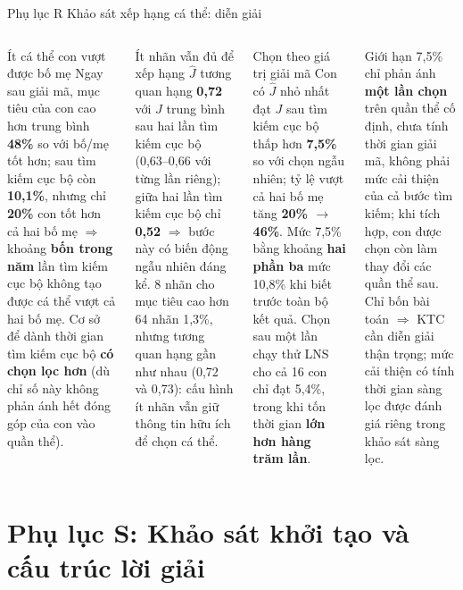 \documentclass[aspectratio=169,10pt,t,xcolor={table}]{beamer}
\newcommand{\Jhat}{\widehat{J}}
\newcommand{\apptitle}[2]{Phụ lục #1 \textperiodcentered{} #2}
\begin{document}
\begin{frame}{\apptitle{R}{Khảo sát xếp hạng cá thể: diễn giải}}
\begin{columns}[T,onlytextwidth]
\begin{block}{Ít cá thể con vượt được bố mẹ}
\scriptsize Ngay sau giải mã, mục tiêu của con cao hơn trung bình \textbf{48\%} so với bố/mẹ tốt hơn; sau tìm kiếm cục bộ còn \textbf{10,1\%}, nhưng chỉ \textbf{20\%} con tốt hơn cả hai bố mẹ $\Rightarrow$ khoảng \textbf{bốn trong năm} lần tìm kiếm cục bộ không tạo được cá thể vượt cả hai bố mẹ. Cơ sở để dành thời gian tìm kiếm cục bộ \textbf{có chọn lọc hơn} (dù chỉ số này không phản ánh hết đóng góp của con vào quần thể).
\end{block}
\begin{block}{Ít nhãn vẫn đủ để xếp hạng}
\scriptsize $\Jhat$ tương quan hạng \textbf{0,72} với $J$ trung bình sau hai lần tìm kiếm cục bộ (0,63--0,66 với từng lần riêng); giữa hai lần tìm kiếm cục bộ chỉ \textbf{0,52} $\Rightarrow$ bước này có biến động ngẫu nhiên đáng kể. 8 nhãn cho mục tiêu cao hơn 64 nhãn 1,3\%, nhưng tương quan hạng gần như nhau (0,72 và 0,73): cấu hình ít nhãn vẫn giữ thông tin hữu ích để chọn cá thể.
\end{block}
\begin{block}{Chọn theo giá trị giải mã}
\scriptsize Con có $\Jhat$ nhỏ nhất đạt $J$ sau tìm kiếm cục bộ thấp hơn \textbf{7,5\%} so với chọn ngẫu nhiên; tỷ lệ vượt cả hai bố mẹ tăng \textbf{20\% $\to$ 46\%}. Mức 7,5\% bằng khoảng \textbf{hai phần ba} mức 10,8\% khi biết trước toàn bộ kết quả. Chọn sau một lần chạy thử LNS cho cả 16 con chỉ đạt 5,4\%, trong khi tốn thời gian \textbf{lớn hơn hàng trăm lần}.
\end{block}
\begin{alertblock}{Giới hạn}
\scriptsize 7,5\% chỉ phản ánh \textbf{một lần chọn} trên quần thể cố định, chưa tính thời gian giải mã, không phải mức cải thiện của cả bước tìm kiếm; khi tích hợp, con được chọn còn làm thay đổi các quần thể sau. Chỉ bốn bài toán $\Rightarrow$ KTC cần diễn giải thận trọng; mức cải thiện có tính thời gian sàng lọc được đánh giá riêng trong khảo sát sàng lọc.
\end{alertblock}
\end{columns}
\end{frame}

\section{Phụ lục S: Khảo sát khởi tạo và cấu trúc lời giải}
\end{document}
